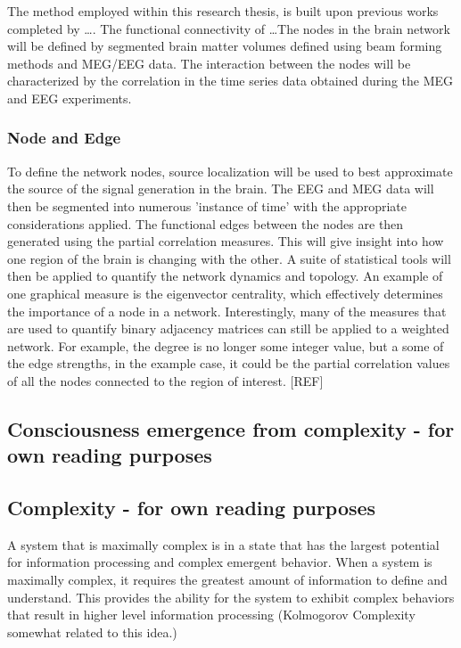 \documentclass{article}
\begin{document}
The method employed within this research thesis, is built upon previous works completed by \dots. The functional connectivity of \dots The nodes in the brain network will be defined by segmented brain matter volumes defined using beam forming methods and MEG/EEG data. The interaction between the nodes will be characterized by the correlation in the time series data obtained during the MEG and EEG experiments.

\subsubsection*{Node and Edge}
To define the network nodes, source localization will be used to best approximate the source of the signal generation in the brain. The EEG and MEG data will then be segmented into numerous 'instance of time' with the appropriate considerations applied. The functional edges between the nodes are then generated using the partial correlation measures. This will give insight into how one region of the brain is changing with the other. A suite of statistical tools will then be applied to quantify the network dynamics and topology. An example of one graphical measure is the eigenvector centrality, which effectively determines the importance of a node in a network. Interestingly, many of the measures that are used to quantify binary adjacency matrices can still be applied to a weighted network. For example, the degree is no longer some integer value, but a some of the edge strengths, in the example case, it could be the partial correlation values of all the nodes connected to the region of interest. [REF]

\subsection{Consciousness emergence from complexity - for own reading purposes}

\subsection{Complexity - for own reading purposes}
A system that is maximally complex is in a state that has the largest potential for information processing and complex emergent behavior. When a system is maximally complex, it requires the greatest amount of information to define and understand. This provides the ability for the system to exhibit complex behaviors that result in higher level information processing (Kolmogorov Complexity somewhat related to this idea.)
\end{document}
